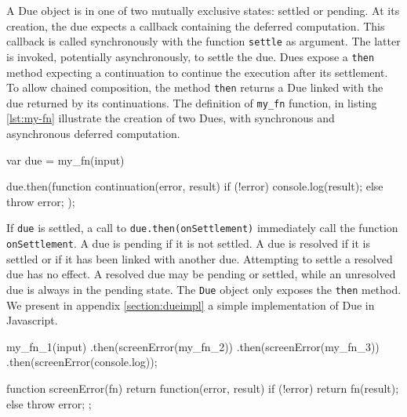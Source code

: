 A Due object is in one of two mutually exclusive states: settled or pending.
At its creation, the due expects a callback containing the deferred computation.
This callback is called synchronously with the function \texttt{settle} as argument.
The latter is invoked, potentially asynchronously, to settle the due.
Dues expose a \texttt{then} method expecting a continuation to continue the execution after its settlement.
To allow chained composition, the method \texttt{then} returns a Due linked with the due returned by its continuations.
The definition of \texttt{my\_fn} function, in listing \ref{lst:my-fn} illustrate the creation of two Dues, with synchronous and asynchronous deferred computation.

\begin{code}[js, %
             caption={Example of a due}, %
             label={lst:due}] %
var due = my_fn(input)

due.then(function continuation(error, result) {
  if (!error) {
    console.log(result);
  } else {
    throw error;
  }
});
\end{code}

If \texttt{due} is settled, a call to \texttt{due.then(onSettlement)} immediately call the function \texttt{onSettlement}.
A due is pending if it is not settled.
A due is resolved if it is settled or if it has been linked with another due.
Attempting to settle a resolved due has no effect.
A resolved due may be pending or settled, while an unresolved due is always in the pending state.
The \texttt{Due} object only exposes the \texttt{then} method.
We present in appendix \ref{section:dueimpl} a simple implementation of Due in Javascript.

\begin{code}[js, %
             caption={Dues are chained like Promises}, %
             label={lst:dues-sequence}] %
my_fn_1(input)
.then(screenError(my_fn_2))
.then(screenError(my_fn_3))
.then(screenError(console.log));

function screenError(fn) {
  return function(error, result) {
    if (!error) {
      return fn(result);
    } else {
      throw error;
    }
  };
}
\end{code}